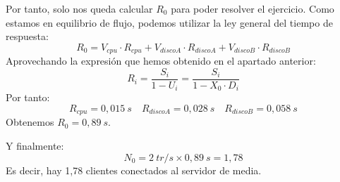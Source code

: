 \documentclass[a4paper,12pt]{article}
\begin{document}
\begin{itemize}
    Por tanto, solo nos queda calcular $R_0$ para poder resolver el ejercicio. Como estamos en equilibrio de flujo, podemos utilizar la ley general del tiempo de respuesta:
    \[
    R_0 = V_{cpu} \cdot R_{cpu} + V_{discoA} \cdot R_{discoA} + V_{discoB} \cdot R_{discoB}
    \]
    Aprovechando la expresión que hemos obtenido en el apartado anterior:
    \[
    R_i = \frac{S_i}{1 - U_i} = \frac{S_i}{1 - X_0 \cdot D_i}
    \]
    Por tanto:
    $$
    R_{cpu} = 0,015~s \quad 
    R_{discoA} = 0,028~s \quad
    R_{discoB} = 0,058~s
    $$
    Obtenemos $R_0 = 0,89~s$.

    Y finalmente:
    \[
    N_0 = 2~tr/s \times 0,89~s = 1,78
    \]
    Es decir, hay 1,78 clientes conectados al servidor de media.






\end{itemize}
\end{document}
